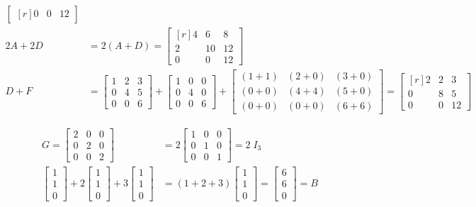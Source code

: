\begin{align*}
\begin{bmatrix*}[r]
		0 & 0  & 12
	\end{bmatrix*}\\
	2A + 2D
	&= 2(A + D)
	=
	\begin{bmatrix*}[r]
		4 & 6  & 8\\
		2 & 10 & 12\\
		0 & 0  & 12
	\end{bmatrix*}\\
	D + F
	&=
	\begin{bmatrix*}
		1 & 2 & 3\\
		0 & 4 & 5\\
		0 & 0 & 6
	\end{bmatrix*}
	+
	\begin{bmatrix*}
		1 & 0 & 0\\
		0 & 4 & 0\\
		0 & 0 & 6
	\end{bmatrix*}
	+
	\begin{bmatrix*}
		(1 + 1) & (2 + 0) & (3 + 0)\\
		(0 + 0) & (4 + 4) & (5 + 0)\\
		(0 + 0) & (0 + 0) & (6 + 6)
	\end{bmatrix*}
	=
	\begin{bmatrix*}[r]
		2 & 2 & 3\\
		0 & 8 & 5\\
		0 & 0 & 12
	\end{bmatrix*}
\end{align*}


\begin{align*}
	G
	=
	\begin{bmatrix*}
		2 & 0 & 0\\
		0 & 2 & 0\\
		0 & 0 & 2
	\end{bmatrix*}
	&=
	2
	\begin{bmatrix*}
		1 & 0 & 0\\
		0 & 1 & 0\\
		0 & 0 & 1
	\end{bmatrix*}
	=
	2 \; I_3\\
	\begin{bmatrix*}
		1\\
		1\\
		0
	\end{bmatrix*}
	+ 2
	\begin{bmatrix*}
		1\\
		1\\
		0
	\end{bmatrix*}
	+ 3
	\begin{bmatrix*}
		1\\
		1\\
		0
	\end{bmatrix*}
	&=
	(1 + 2 + 3)
	\begin{bmatrix*}
		1\\
		1\\
		0
	\end{bmatrix*}
	=
	\begin{bmatrix*}
		6\\
		6\\
		0
	\end{bmatrix*}
	= B
\end{align*}

